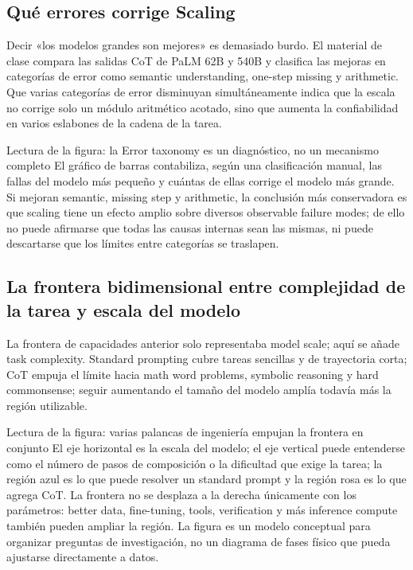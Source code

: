 \subsection{Qué errores corrige Scaling}

Decir «los modelos grandes son mejores» es demasiado burdo. El material de clase compara las salidas CoT de PaLM 62B y 540B y clasifica las mejoras en categorías de error como semantic understanding, one-step missing y arithmetic. Que varias categorías de error disminuyan simultáneamente indica que la escala no corrige solo un módulo aritmético acotado, sino que aumenta la confiabilidad en varios eslabones de la cadena de la tarea.


\begin{knowledgebox}{Lectura de la figura: la Error taxonomy es un diagnóstico, no un mecanismo completo}
El gráfico de barras contabiliza, según una clasificación manual, las fallas del modelo más pequeño y cuántas de ellas corrige el modelo más grande. Si mejoran semantic, missing step y arithmetic, la conclusión más conservadora es que scaling tiene un efecto amplio sobre diversos observable failure modes; de ello no puede afirmarse que todas las causas internas sean las mismas, ni puede descartarse que los límites entre categorías se traslapen.
\end{knowledgebox}

\subsection{La frontera bidimensional entre complejidad de la tarea y escala del modelo}

La frontera de capacidades anterior solo representaba model scale; aquí se añade task complexity. Standard prompting cubre tareas sencillas y de trayectoria corta; CoT empuja el límite hacia math word problems, symbolic reasoning y hard commonsense; seguir aumentando el tamaño del modelo amplía todavía más la región utilizable.


\begin{knowledgebox}{Lectura de la figura: varias palancas de ingeniería empujan la frontera en conjunto}
El eje horizontal es la escala del modelo; el eje vertical puede entenderse como el número de pasos de composición o la dificultad que exige la tarea; la región azul es lo que puede resolver un standard prompt y la región rosa es lo que agrega CoT. La frontera no se desplaza a la derecha únicamente con los parámetros: better data, fine-tuning, tools, verification y más inference compute también pueden ampliar la región. La figura es un modelo conceptual para organizar preguntas de investigación, no un diagrama de fases físico que pueda ajustarse directamente a datos.
\end{knowledgebox}

